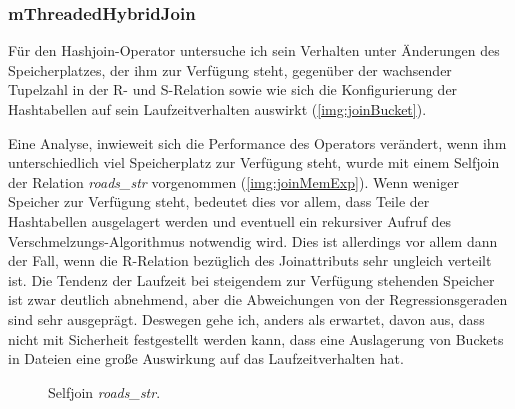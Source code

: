 \documentclass[a4paper,12pt,twoside]{article}
\newcommand{\Fb}[1]{\textit{#1}} %
\begin{document}
\subsubsection{mThreadedHybridJoin}
\label{exp:hash}

Für den Hashjoin-Operator untersuche ich sein Verhalten unter Änderungen des Speicherplatzes, der ihm zur Verfügung steht, gegenüber der wachsender Tupelzahl in der R- und S-Relation sowie wie sich die Konfigurierung der Hashtabellen auf sein Laufzeitverhalten auswirkt (\autoref{img:joinBucket}).

Eine Analyse, inwieweit sich die Performance des Operators verändert, wenn ihm unterschiedlich viel Speicherplatz zur Verfügung steht, wurde mit einem Selfjoin der Relation \Fb{roads\_str} vorgenommen (\autoref{img:joinMemExp}). Wenn weniger Speicher zur Verfügung steht, bedeutet dies vor allem, dass Teile der Hashtabellen ausgelagert werden und eventuell ein rekursiver Aufruf des Verschmelzungs-Algorithmus notwendig wird. Dies ist allerdings vor allem dann der Fall, wenn die R-Relation bezüglich des Joinattributs sehr ungleich verteilt ist. Die Tendenz der Laufzeit bei steigendem zur Verfügung stehenden Speicher ist zwar deutlich abnehmend, aber die Abweichungen von der Regressionsgeraden sind sehr ausgeprägt. Deswegen gehe ich, anders als erwartet, davon aus, dass nicht mit Sicherheit festgestellt werden kann, dass eine Auslagerung von Buckets in Dateien eine große Auswirkung auf das Laufzeitverhalten hat.

\begin{figure}
	\centering
	\qquad	
	\caption{Selfjoin \Fb{roads\_str}.}
	\label{img:joinExpAllg}
\end{figure}
\end{document}
